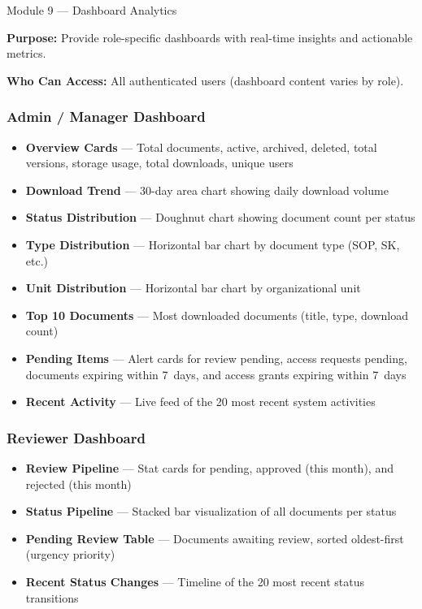 \begin{ugModule}{Module 9 --- Dashboard Analytics}

  \textbf{Purpose:}
  Provide role-specific dashboards with real-time insights and
  actionable metrics.

  \textbf{Who Can Access:}
  All authenticated users (dashboard content varies by role).

  \subsubsection*{Admin / Manager Dashboard}
  \begin{itemize}[leftmargin=18pt]
    \item \textbf{Overview Cards} --- Total documents, active,
      archived, deleted, total versions, storage usage, total
      downloads, unique users
    \item \textbf{Download Trend} --- 30-day area chart showing
      daily download volume
    \item \textbf{Status Distribution} --- Doughnut chart showing
      document count per status
    \item \textbf{Type Distribution} --- Horizontal bar chart
      by document type (SOP, SK, etc.)
    \item \textbf{Unit Distribution} --- Horizontal bar chart
      by organizational unit
    \item \textbf{Top 10 Documents} --- Most downloaded documents
      (title, type, download count)
    \item \textbf{Pending Items} --- Alert cards for review
      pending, access requests pending, documents expiring
      within 7~days, and access grants expiring within 7~days
    \item \textbf{Recent Activity} --- Live feed of the 20 most
      recent system activities
  \end{itemize}

  \subsubsection*{Reviewer Dashboard}
  \begin{itemize}[leftmargin=18pt]
    \item \textbf{Review Pipeline} --- Stat cards for pending,
      approved (this month), and rejected (this month)
    \item \textbf{Status Pipeline} --- Stacked bar visualization
      of all documents per status
    \item \textbf{Pending Review Table} --- Documents awaiting
      review, sorted oldest-first (urgency priority)
    \item \textbf{Recent Status Changes} --- Timeline of the 20
      most recent status transitions
  \end{itemize}


\end{ugModule}
